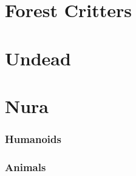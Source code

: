 \documentclass[a4paper,openany]{book}
\begin{document}
\chapter{Forest Critters}

\begin{multicols}{2}

\bear

\boar

\chitincrawler

\basilisk

\end{multicols}

\chapter{Undead}

\begin{multicols}{2}

\ghoul

\ghast

\demilich

\lich

\end{multicols}

\chapter{Nura}

\begin{multicols}{2}

\subsection{Humanoids}

\goblin

\goblin

\goblinnuramancer

\hobgoblin

\ogre

\deepogre

\subsection{Animals}

\nurarat

\nurahorse

\nuracrab

\nuracat

\nuraslug

\nuraspider

\nurawolf

\end{multicols}
\end{document}
